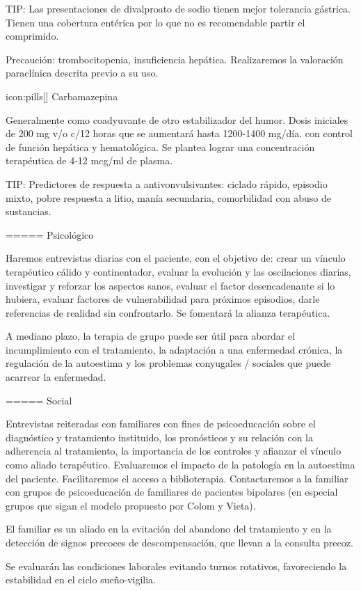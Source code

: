 TIP: Las presentaciones de divalproato de sodio tienen mejor tolerancia gástrica. Tienen una cobertura entérica por lo que no es recomendable partir el comprimido.

Precaución: trombocitopenia, insuficiencia hepática. Realizaremos la valoración paraclínica descrita previo a su uso.

icon:pills[] Carbamazepina

Generalmente como coadyuvante de otro estabilizador del humor. Dosis iniciales de 200 mg v/o c/12 horas que se aumentará hasta 1200-1400 mg/día. con control de función hepática y hematológica. Se plantea lograr una concentración terapéutica de 4-12 mcg/ml de plasma.

TIP: Predictores de respuesta a antivonvulsivantes: ciclado rápido, episodio mixto, pobre respuesta a litio, manía secundaria, comorbilidad con abuso de sustancias.

===== Psicológico

Haremos entrevistas diarias con el paciente, con el objetivo de: crear un vínculo terapéutico cálido y continentador, evaluar la evolución y las oscilaciones diarias, investigar y reforzar los aspectos sanos, evaluar el factor desencadenante si lo hubiera, evaluar factores de vulnerabilidad para próximos episodios, darle referencias de realidad sin confrontarlo. Se fomentará la alianza terapéutica.

A mediano plazo, la terapia de grupo puede ser útil para abordar el incumplimiento con el tratamiento, la adaptación a una enfermedad crónica, la regulación de la autoestima y los problemas conyugales / sociales que puede acarrear la enfermedad.

===== Social

Entrevistas reiteradas con familiares con fines de psicoeducación sobre el diagnóstico y tratamiento instituido, los pronósticos y su relación con la adherencia al tratamiento, la importancia de los controles y afianzar el vínculo como aliado terapéutico. Evaluaremos el impacto de la patología en la autoestima del paciente. Facilitaremos el acceso a biblioterapia. Contactaremos a la familiar con grupos de psicoeducación de familiares de pacientes bipolares (en especial grupos que sigan el modelo propuesto por Colom y Vieta).

El familiar es un aliado en la evitación del abandono del tratamiento y en la detección de signos precoces de descompensación, que llevan a la consulta precoz.

Se evaluarán las condiciones laborales evitando turnos rotativos, favoreciendo la estabilidad en el ciclo sueño-vigilia.

